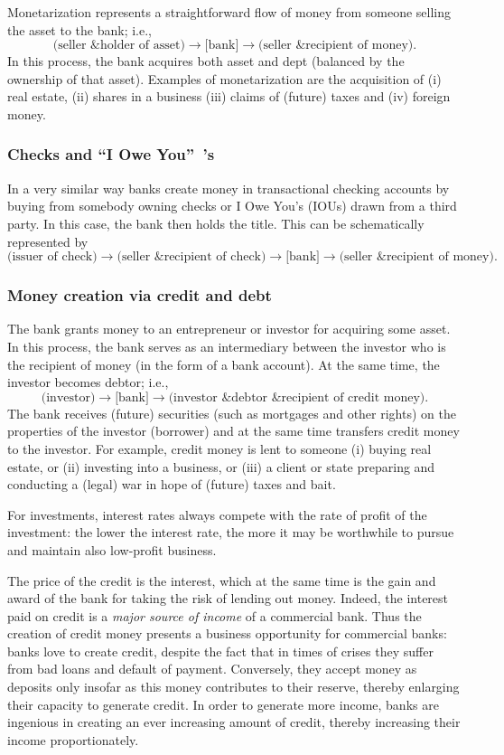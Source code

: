 \documentclass[aps,rmp,preprint,amsfonts,showpacs,showkeys]{revtex4}
\begin{document}
Monetarization represents a straightforward flow of money from someone selling the asset to the bank; i.e.,
$$
\mbox{(seller \& holder of asset)}
\rightarrow
\mbox{[bank]}
\rightarrow
\mbox{(seller \& recipient of money)}
.
$$
In this process, the bank acquires both asset and dept (balanced by the ownership of that asset).
Examples of monetarization are the acquisition of
(i) real estate, (ii) shares in a business (iii) claims of (future) taxes and (iv) foreign money.


\subsubsection{Checks and ``I Owe You''~'s}

In a very similar way banks create money in transactional checking accounts by buying from somebody owning
checks or I Owe You's (IOUs) drawn from a third party.  In this case, the bank then holds the title.
This can be schematically represented by
$$
\mbox{(issuer of check)}
\rightarrow
\mbox{(seller \& recipient of check)}
\rightarrow
\mbox{[bank]}
\rightarrow
\mbox{(seller \& recipient of money)}
.
$$

\subsubsection{Money creation via credit and debt}

The bank grants money to an entrepreneur or investor for acquiring some asset.
In this process, the bank serves as an intermediary between the investor who is the recipient of money (in the form of a bank account).
At the same time, the investor becomes debtor; i.e.,
$$
\mbox{(investor)}
\rightarrow
\mbox{[bank]}
\rightarrow
\mbox{(investor \& debtor \& recipient of credit money)}
.
$$
The bank receives (future) securities (such as mortgages and other rights)
on the properties of the investor (borrower) and at the same time transfers credit money to the investor.
For example, credit money is lent to someone (i) buying real estate, or (ii) investing  into a business, or
(iii) a client or state preparing and conducting a (legal) war in hope of (future) taxes and bait.


For investments, interest rates always compete with the rate of profit of the investment:
the lower the interest rate, the more it may be worthwhile to pursue and maintain also low-profit business.

The price of the credit is the interest,
which at the same time is the gain and award of the bank for taking the risk of lending out money.
Indeed, the interest paid on  credit is a {\em major source of income} of a commercial bank.
Thus the creation of credit  money presents a business opportunity for commercial banks:
banks love to create credit, despite the fact that in times of crises they suffer from bad loans and default of payment.
Conversely, they accept money as deposits only insofar as this money contributes to their reserve,
thereby enlarging their capacity to generate credit.
In order to generate more income, banks are ingenious in creating an ever increasing amount of credit,
thereby increasing their income proportionately.
\end{document}
